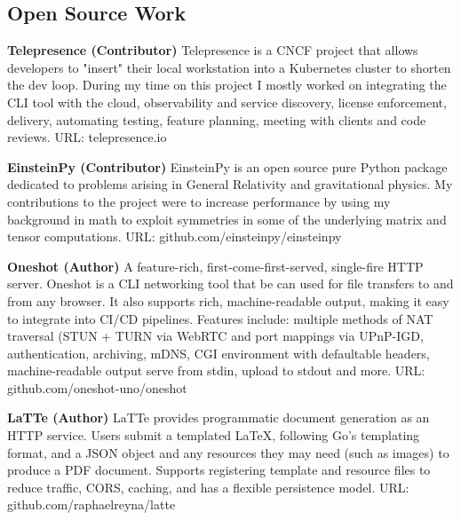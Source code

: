\documentclass[margin]{./res}
\begin{document}
  

\address{Email: raphaelreyna@protonmail.com \\
  Phone: (626) 384-1342 \\
  Site: rphlrn.com}
                           
                        
\begin{resume} 
\section{Open Source Work}
{\bf Telepresence (Contributor)}\newline
Telepresence is a CNCF project that allows developers to "insert" their local workstation into a Kubernetes cluster to shorten the dev loop.
During my time on this project I mostly worked on integrating the CLI tool with the cloud, observability and service discovery, license enforcement, delivery, automating testing, feature planning, meeting with clients and code reviews.\newline
URL: telepresence.io

{\bf EinsteinPy (Contributor)}\newline
EinsteinPy is an open source pure Python package dedicated to problems arising in General Relativity and gravitational physics.
My contributions to the project were to increase performance by using my background in math to exploit symmetries in some of the underlying matrix and tensor computations.\newline
URL: github.com/einsteinpy/einsteinpy

{\bf Oneshot (Author)}\newline
A feature-rich, first-come-first-served, single-fire HTTP server. Oneshot is a CLI networking tool that be can used for file transfers to and from any browser. It also supports rich, machine-readable output, making it easy to integrate into CI/CD pipelines.
Features include: multiple methods of NAT traversal (STUN + TURN via WebRTC and port mappings via UPnP-IGD, authentication, archiving, mDNS, CGI environment with defaultable headers, machine-readable output serve from stdin, upload to stdout and more.\newline
URL: github.com/oneshot-uno/oneshot

{\bf LaTTe (Author)}\newline
LaTTe provides programmatic document generation as an HTTP service.
Users submit a templated LaTeX, following Go's templating format, and a JSON object and any resources they may need (such as images) to produce
a PDF document. Supports registering template and resource files to reduce traffic, CORS, caching, and has a flexible persistence model.\newline
URL: github.com/raphaelreyna/latte


\end{resume}
\end{document}
